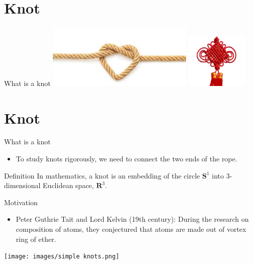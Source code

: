 \section{Knot}
\begin{frame}{What is a knot}
	\centering
	\includegraphics[width=7cm]{images/images.jpg}
	\includegraphics[width=3cm]{images/chineseknot.png}
\end{frame}

\section{Knot}
\begin{frame}{What is a knot}
	\begin{itemize}
		\item To study knots rigorously, we need to connect the two ends of the rope.
	\end{itemize}
	\begin{kulblock}{Definition}
		In mathematics, a knot is an embedding of the circle $\mathbf{S}^1$ into 3-dimensional Euclidean space, $\mathbf{R}^3$.
	\end{kulblock}
	
\end{frame}

\begin{frame}{Motivation}
	\begin{itemize}
		\item Peter Guthrie Tait and Lord Kelvin (19th century): During the research on composition of atoms, they conjectured that atoms are made out of vortex ring of ether.
	\end{itemize}
	\centering
	\texttt{[image: images/simple knots.png]}
\end{frame}

